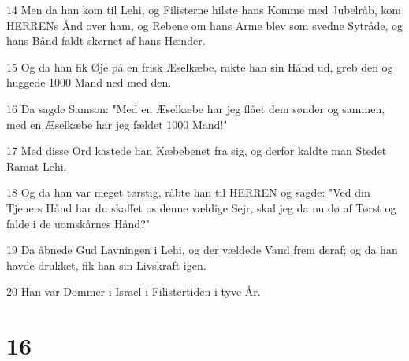 \par 14 Men da han kom til Lehi, og Filisterne hilste hans Komme med Jubelråb, kom HERRENs Ånd over ham, og Rebene om hans Arme blev som svedne Sytråde, og hans Bånd faldt skørnet af hans Hænder.
\par 15 Og da han fik Øje på en frisk Æselkæbe, rakte han sin Hånd ud, greb den og huggede 1000 Mand ned med den.
\par 16 Da sagde Samson: "Med en Æselkæbe har jeg flået dem sønder og sammen, med en Æselkæbe har jeg fældet 1000 Mand!"
\par 17 Med disse Ord kastede han Kæbebenet fra sig, og derfor kaldte man Stedet Ramat Lehi.
\par 18 Og da han var meget tørstig, råbte han til HERREN og sagde: "Ved din Tjeners Hånd har du skaffet os denne vældige Sejr, skal jeg da nu dø af Tørst og falde i de uomskårnes Hånd?"
\par 19 Da åbnede Gud Lavningen i Lehi, og der vældede Vand frem deraf; og da han havde drukket, fik han sin Livskraft igen.
\par 20 Han var Dommer i Israel i Filistertiden i tyve År.

\chapter{16}


